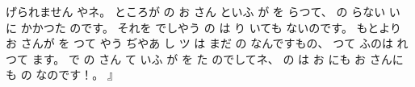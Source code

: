 げられません
やネ。
%
ところが
の
お
さん
といふ
が
を
らつて、
%
の
らない
い
に
かかつた
のです。
%
それを
でしやう
の
は
り
いても
ないのです。
%
もとより
お
さんが
を
つて
やう
ぢやあ
し
ツ
は
まだ
の
なんですもの、
%
つて
ふのは
れ
つて
ます。
%
で
の
さん
て
いふ
が
を
た
のでしてネ、
%
の
は
お
にも
お
さんにも
の
なのです！。
』
